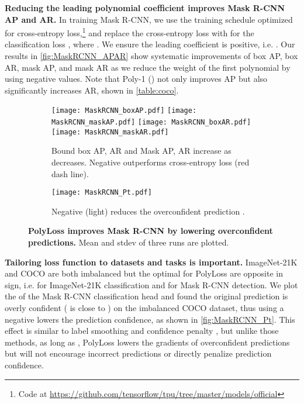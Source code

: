 \textbf{Reducing the leading polynomial coefficient improves Mask R-CNN AP and AR.}  In training Mask R-CNN, we use the training schedule optimized for cross-entropy loss,\footnote{\label{detection}Code at \url{https://github.com/tensorflow/tpu/tree/master/models/official}} and replace the cross-entropy loss with  for the classification loss , where . We ensure the leading coefficient is positive, i.e. . Our results in \autoref{fig:MaskRCNN_APAR} show systematic improvements of box AP, box AR, mask AP, and mask AR as we reduce the weight of the first polynomial by using negative  values. Note that Poly-1 () not only improves AP but also significantly increases AR, shown in \autoref{table:coco}. 
\begin{figure}[!h]
\vspace{-5pt}
  \centering
  \begin{subfigure}{0.6\textwidth}
  \centering
  \texttt{[image: MaskRCNN\_boxAP.pdf]}
  \texttt{[image: MaskRCNN\_maskAP.pdf]}
  \texttt{[image: MaskRCNN\_boxAR.pdf]}
  \texttt{[image: MaskRCNN\_maskAR.pdf]}
  \caption{Bound box AP, AR and Mask AP, AR increase as  decreases. Negative  outperforms cross-entropy loss (red dash line).}
  \label{fig:MaskRCNN_APAR}
  \end{subfigure}
  \quad
  \begin{subfigure}{0.35\textwidth}
  \texttt{[image: MaskRCNN\_Pt.pdf]}
  \caption{Negative  (light) reduces the overconfident prediction .}
  \label{fig:MaskRCNN_Pt}
  \end{subfigure}
  \vspace{-5pt}
  \caption{\textbf{PolyLoss improves Mask R-CNN by lowering overconfident predictions.} Mean and stdev of three runs are plotted.}
  \vspace{-18pt}
\end{figure}

\textbf{Tailoring loss function to datasets and tasks is important.}  ImageNet-21K and COCO are both imbalanced but the optimal  for PolyLoss are opposite in sign, i.e.  for ImageNet-21K classification and  for Mask R-CNN detection. We plot the  of the Mask R-CNN classification head and found the original prediction is overly confident ( is close to ) on the imbalanced COCO dataset, thus using a negative  lowers the prediction confidence, as shown in \autoref{fig:MaskRCNN_Pt}. This effect is similar to label smoothing \citep{szegedy2016rethinking} and confidence penalty \citep{pereyra2017regularizing}, but unlike those methods, as long as , PolyLoss lowers the gradients of overconfident predictions but will not encourage incorrect predictions or directly penalize prediction confidence. 
\vspace{-10pt}
